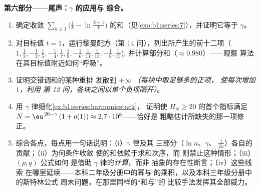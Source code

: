 \begin{problem}[{周末问题——$H_n = \ln n + \gamma +
\frac{1}{2n} + O(n^{-2})$，并将 $1 - \frac12 +
\frac13 - \dots$ 重排为 $\frac{\ln 2}{2}$}]
\medskip
\noindent\textbf{第六部分——尾声：$\gamma$ 的应用与
综合。}
\begin{enumerate}[resume]
  \item 确定收敛
        $\sum_{k\geq1} \bigl(\frac1k - \ln\frac{k+1}{k}\bigr)$
        的和（见\cref{exo:b1:series:7}），并证明它等于 $\gamma$。
  \item 对目标值 $t =
        1$，运行黎曼配方（第 14 问），列出所产生的前十二项（$1, \frac13,
        -\frac12, \frac15, -\frac14, \frac17, \frac19, -\frac16,
        \frac1{11}, \frac1{13}, -\frac18, \frac1{15}$),
        并计算部分和（$\approx 0.980$）——观察
        算法在其目标值附近如何“呼吸”。
  \item 证明交错调和的某种重排
        发散到 $+\infty$ \emph{（每块中取足够多的正项，
        使每次增加 $1$，利用
        第 12 问，各块之间以单个负项隔开）}。
  \item 用 $\gamma$ 律细化\cref{ex:b1:series:harmonicstack}，
        证明使 $H_N \geq
        20$ 的首个指标满足 $N = \eu^{\,20 - \gamma}\,(1 + o(1))
        \approx 2.7\cdot10^{8}$——恰好是
        粗略估计所缺失的那一项修正。
  \item 综合各点，每点用一句话说明：（i）$\gamma$ 律及其
        三部分（$\ln n$、$\gamma$、
        $\frac{1}{2n}$）各自的贡献；（ii）为何条件收敛
        使的和依赖于求和次序，而
        则禁止这种情形；（iii）$(p,q)$ 公式如何
        是借助 $\gamma$ 律的\emph{计算}，而非
        抽象的存在性断言；（iv）这些线索
        在哪里延续——本科二年级分册中的幂与
        的乘积，以及本科三年级分册中的斯特林公式
        周末问题，在那里同样的“和与”的
        比较手法发挥其全部威力。
\end{enumerate}
\end{problem}
